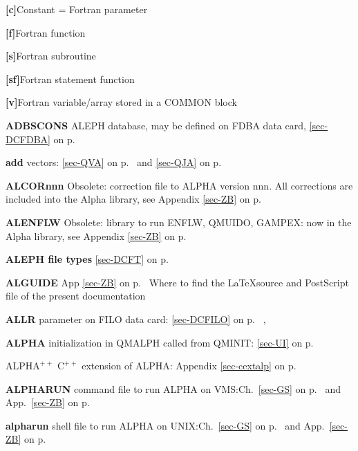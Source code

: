  \item{\bf [c]}Constant = Fortran parameter\\
 \item{\bf [f]}Fortran function\\
 \item{\bf [s]}Fortran subroutine\\
 \item{\bf [sf]}Fortran statement function\\
 \item{\bf [v]}Fortran variable/array stored in a COMMON block
 
 \item{\bf ADBSCONS } ALEPH database, may be defined on FDBA data card, \ref{sec-DCFDBA} on p.~\pageref{sec-DCFDBA}\\
 \item{\bf add    }vectors: \ref{sec-QVA} on
 p.~\pageref{sec-QVA} and \ref{sec-QJA} on p.~\pageref{sec-QJA}\\
 \item{\bf ALCORnnn }
  Obsolete: correction file to ALPHA version nnn.
 All corrections are included into the Alpha library, see
 Appendix \ref{sec-ZB} on p.~\pageref{sec-ZB}\\
 \item{\bf ALENFLW  }Obsolete: library to run ENFLW, QMUIDO, GAMPEX:
 now  in the Alpha library, see
 Appendix \ref{sec-ZB} on p.~\pageref{sec-ZB}\\
 \item{\bf ALEPH file types }\ref{sec-DCFT} on p.~\pageref{sec-DCFT}\\
 \item{\bf ALGUIDE} App \ref{sec-ZB} on p.~\pageref{sec-ZB}  Where to find the \LaTeX source
  and PostScript file of the present documentation\\
 \item{\bf ALLR    }parameter on FILO data card: \ref{sec-DCFILO} on
 p.~\pageref{sec-DCFILO}
 , \item{\bf ALPHA   }initialization in QMALPH called from QMINIT:
 \ref{sec-UI} on p.~\pageref{sec-UI}\\
 \item{\bf $\mathrm{ALPHA^{++}}$} $\mathrm{C^{++}}$ extension of ALPHA: Appendix \ref{sec-cextalp} on p.~\pageref{sec-cextalp}\\
 \item{\bf ALPHARUN    }command file to run ALPHA on VMS:Ch.~\ref{sec-GS} on p.~\pageref{sec-GS}
 and App.~\ref{sec-ZB} on p.~\pageref{sec-ZB}\\
 \item{\bf alpharun    }shell file to run ALPHA on UNIX:Ch.~\ref{sec-GS} on p.~\pageref{sec-GS}
 and App.~\ref{sec-ZB} on p.~\pageref{sec-alphar}
 
